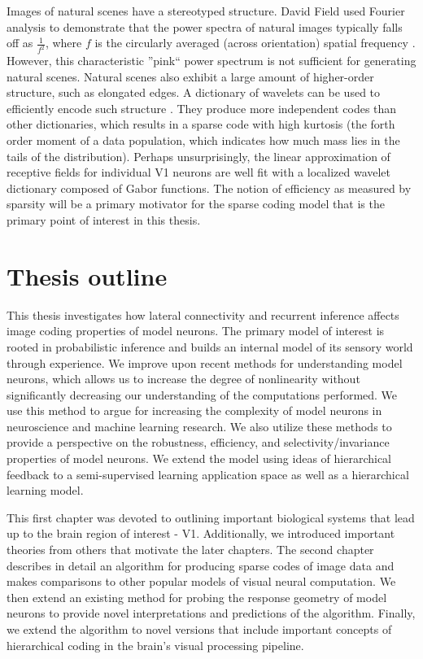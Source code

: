 Images of natural scenes have a stereotyped structure. David Field used Fourier analysis to demonstrate that the power spectra of natural images typically falls off as $\tfrac{1}{f^{2}}$, where $f$ is the circularly averaged (across orientation) spatial frequency \parencite{field1987relations}. However, this characteristic ''pink`` power spectrum is not sufficient for generating natural scenes. Natural scenes also exhibit a large amount of higher-order structure, such as elongated edges. A dictionary of wavelets can be used to efficiently encode such structure \parencite{field1999wavelets}. They produce more independent codes than other dictionaries, which results in a sparse code with high kurtosis (the forth order moment of a data population, which indicates how much mass lies in the tails of the distribution). Perhaps unsurprisingly, the linear approximation of receptive fields for individual V1 neurons are well fit with a localized wavelet dictionary composed of Gabor functions. The notion of efficiency as measured by sparsity will be a primary motivator for the sparse coding model that is the primary point of interest in this thesis.

\section{Thesis outline}
This thesis investigates how lateral connectivity and recurrent inference affects image coding properties of model neurons. The primary model of interest is rooted in probabilistic inference and builds an internal model of its sensory world through experience. We improve upon recent methods for understanding model neurons, which allows us to increase the degree of nonlinearity without significantly decreasing our understanding of the computations performed. We use this method to argue for increasing the complexity of model neurons in neuroscience and machine learning research. We also utilize these methods to provide a perspective on the robustness, efficiency, and selectivity/invariance properties of model neurons. We extend the model using ideas of hierarchical feedback to a semi-supervised learning application space as well as a hierarchical learning model.

This first chapter was devoted to outlining important biological systems that lead up to the brain region of interest - V1. Additionally, we introduced important theories from others that motivate the later chapters. The second chapter describes in detail an algorithm for producing sparse codes of image data and makes comparisons to other popular models of visual neural computation. We then extend an existing method for probing the response geometry of model neurons to provide novel interpretations and predictions of the algorithm. Finally, we extend the algorithm to novel versions that include important concepts of hierarchical coding in the brain's visual processing pipeline.
